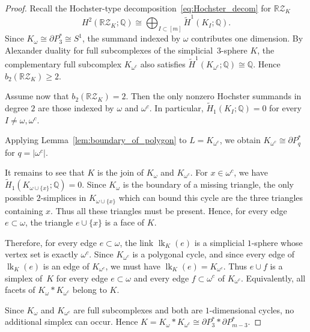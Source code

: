 \documentclass{amsart}
\numberwithin{equation}{section}
\theoremstyle{definition}
\theoremstyle{remark}
\newcommand{\Q}{\mathbb Q}
\newcommand{\RZ}{\mathbb R\mathcal Z}
\DeclareMathOperator{\join}{\ast}
\DeclareMathOperator{\link}{lk}
\begin{document}
\begin{proof}
    Recall the Hochster-type decomposition~\eqref{eq:Hochster_decom} for $\RZ_K$
    $$
        H^2(\RZ_K;\Q) \cong \bigoplus_{I\subset [m]}\widetilde H^1(K_I;\Q).
    $$
    Since $K_\omega\cong \partial P_3^\ast \cong S^1$, the summand indexed by $\omega$ contributes one dimension. 
    By Alexander duality for full subcomplexes of the simplicial~$3$-sphere $K$, the complementary full subcomplex $K_{\omega^c}$ also satisfies $\widetilde H^1(K_{\omega^c};\Q)\cong \Q$.
    Hence $b_2(\RZ_K)\ge 2$.
    
    
    Assume now that $b_2(\RZ_K)=2$. 
    Then the only nonzero Hochster summands in degree $2$ are those indexed by $\omega$ and ${\omega^c}$. 
    In particular, $\widetilde H_1(K_I;\Q)=0$ for every $I\ne \omega,\omega^c$.
    
    Applying Lemma~\ref{lem:boundary_of_polygon} to $L=K_{\omega^c}$, we obtain $K_{\omega^c}\cong \partial P_q^\ast$ for $q=|{\omega^c}|$.
    
    It remains to see that $K$ is the join of $K_\omega$ and $K_{\omega^c}$. 
    For $x\in \omega^c$, we have $\widetilde H_1(K_{\omega\cup\{x\}};\Q)=0$.
    Since $K_\omega$ is the boundary of a missing triangle, the only possible $2$-simplices in $K_{\omega\cup\{x\}}$ which can bound this cycle are the three triangles containing $x$.
    Thus all these triangles must be present.
    Hence, for every edge $e\subset \omega$, the triangle $e\cup\{x\}$ is a face of $K$.
    
    Therefore, for every edge $e\subset \omega$, the link $\link_K(e)$ is a simplicial $1$-sphere whose vertex set is exactly $\omega^c$. 
    Since $K_{\omega^c}$ is a polygonal cycle, and since every edge of~$\link_K(e)$ is an edge of $K_{\omega^c}$, we must have $\link_K(e)=K_{\omega^c}$.
    Thus $e \cup f$ is a simplex of~$K$ for every edge $e\subset \omega$ and every edge $f\subset \omega^c$ of $K_{\omega^c}$. 
    Equivalently, all facets of $K_\omega \join K_{\omega^c}$ belong to $K$. 
    
    Since $K_\omega$ and $K_{\omega^c}$ are full subcomplexes and both are $1$-dimensional cycles, no additional simplex can occur. 
    Hence $K=K_\omega \join K_{\omega^c} \cong \partial P_3^\ast  \join \partial P_{m-3}^\ast$.
\end{proof}
\end{document}
